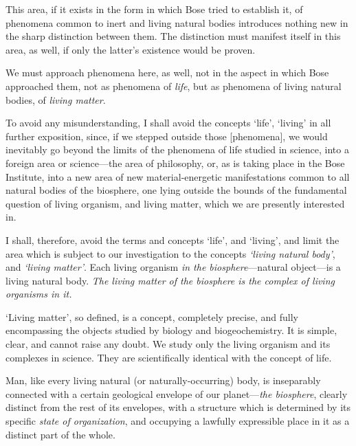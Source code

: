 This area, if it exists in the form in which Bose tried to establish it, of
phenomena common to inert and living natural bodies introduces nothing new in
the sharp distinction between them.  The distinction must manifest itself in
this area, as well, if only the latter's existence would be proven.

We must approach phenomena here, as well, not in the aspect in which Bose
approached them, not as phenomena of \emph{life}, but as phenomena of living
natural bodies, of \emph{living matter}.

To avoid any misunderstanding, I shall avoid the concepts `life', `living' in
all further exposition, since, if we stepped outside those
[phenomena], we would inevitably
go beyond the limits of the phenomena of life studied in science, into a
foreign area or science---the area of philosophy, or, as is taking place in the
Bose Institute, into a new area of new material-energetic manifestations common
to all natural bodies of the biosphere, one lying outside the bounds of the
fundamental question of living organism, and living matter, which we are
presently interested in.

I shall, therefore, avoid the terms and concepts `life', and `living', and
limit the area which is subject to our investigation to the concepts
\emph{`living natural body'}, and \emph{`living matter'}.  Each living organism
\emph{in the biosphere}---natural object---is a living natural body.  \emph{The
living matter of the biosphere is the complex of living organisms in it.}

`Living matter', so defined, is a concept, completely precise, and fully
encompassing the objects studied by biology and biogeochemistry.  It is simple,
clear, and cannot raise any doubt.  We study only the living organism and its
complexes in science.  They are scientifically identical with the concept of
life.


\Section %
Man, like every living natural (or naturally-occurring) body, is inseparably connected with a certain geological
envelope of our planet---\emph{the biosphere}, clearly distinct from the rest
of its envelopes, with a structure which is determined by its specific
\emph{state of organization}, and occupying a
lawfully expressible place in it as a distinct part of the whole.

